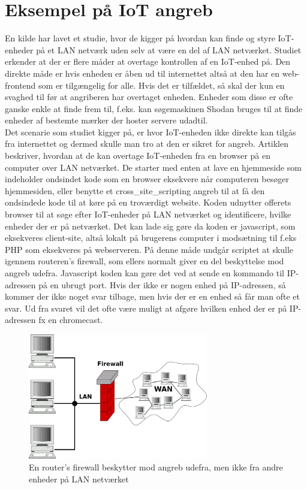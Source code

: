 \section{Eksempel på IoT angreb}
En kilde \autocite{UCBerkeley} har lavet et studie, hvor de kigger på hvordan kan finde og styre IoT-enheder på et LAN netværk uden selv at være en del af LAN netværket. Studiet erkender at der er flere måder at overtage kontrollen af en IoT-enhed på. Den direkte måde er hvis enheden er åben ud til internettet altså at den har en web-frontend som er tilgængelig for alle. Hvis det er tilfældet, så skal der kun en svaghed til før at angriberen har overtaget enheden. Enheder som disse er ofte ganske enkle at finde frem til, f.eks. kan søgemaskinen Shodan bruges til at finde enheder af bestemte mærker der hoster servere udadtil.\\
Det scenarie som studiet kigger på, er hvor IoT-enheden ikke direkte kan tilgås fra internettet og dermed skulle man tro at den er sikret for angreb. Artiklen beskriver, hvordan at de kan overtage IoT-enheden fra en browser på en computer over LAN netværket.
De starter med enten at lave en hjemmeside som indeholder ondsindet kode som en browser eksekvere når computeren besøger hjemmesiden, eller benytte et \gls{cross_site_scripting} angreb til at få den ondsindede kode til at køre på en troværdigt website. Koden udnytter offerets browser til at søge efter IoT-enheder på LAN netværket og identificere, hvilke enheder der er på netværket. Det kan lade sig gøre da koden er javascript, som eksekveres client-site, altså lokalt på brugerens computer i modsætning til f.eks PHP som eksekveres på webserveren. På denne måde undgår scriptet at skulle igennem routeren's firewall, som ellers normalt giver en del beskyttelse mod angreb udefra.
Javascript koden kan gøre det ved at sende en kommando til IP-adressen på en ubrugt port. Hvis der ikke er nogen enhed på IP-adressen, så kommer der ikke noget svar tilbage, men hvis der er en enhed så får man ofte et svar. Ud fra svaret vil det ofte være muligt at afgøre hvilken enhed der er på IP-adressen fx en chromecast.\\
    \begin{figure}[H]
        \centering
            \includegraphics[width=0.7\textwidth]{figures/800px-Gateway_firewall.png}
        \caption{En router's firewall beskytter mod angreb udefra, men ikke fra andre enheder på LAN netværket\label{fig:updates}}
    \end{figure}
